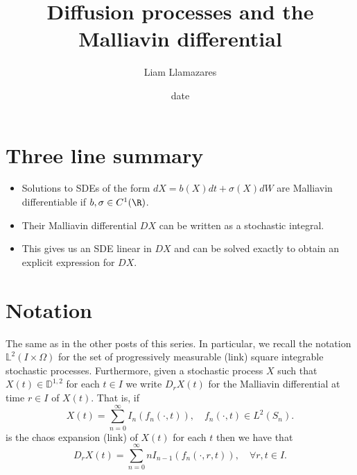 \documentclass[12pt]{article}
\begin{document}
\title{Diffusion processes and the Malliavin differential}
\author{Liam Llamazares}
\date{date}
\maketitle
\section{ Three line summary}
\begin{itemize}
	\item Solutions to SDEs of the form $dX=b(X) d t +\sigma (X)dW $ are Malliavin differentiable if $b,\sigma \in C^1(\R)$.
	\item Their Malliavin differential $DX$ can be written as a stochastic integral.
	\item This gives us an SDE linear in $DX$ and can be solved exactly to obtain an explicit expression for  $DX$.
\end{itemize}
\section{Notation}
The same as in the other posts of this series. In particular, we recall the notation $\mathbb{L}^2(I\times\Omega)$ for the set of progressively measurable (link) square integrable stochastic processes. Furthermore, given a stochastic process $X$ such that  $X(t)\in \mathbb{D}^{1,2}$ for each $t\in I$ we write $D_rX(t)$ for the Malliavin differential at  time $r\in I$ of $X(t)$. That is, if
\begin{equation}\label{ce}
	X(t)=\sum_{n=0}^{\infty}  I_n(f_n(\cdot ,t)),\quad f_n(\cdot ,t)\in L^2(S_n).
\end{equation}
is the chaos expansion (link) of $X(t)$ for each  $t$ then we have that
\begin{equation}\label{ced}
	D_rX(t)=\sum_{n=0}^{\infty}  nI_{n-1}(f_n(\cdot ,r,t)) , \quad\forall r,t\in I.
\end{equation}
\end{document}

